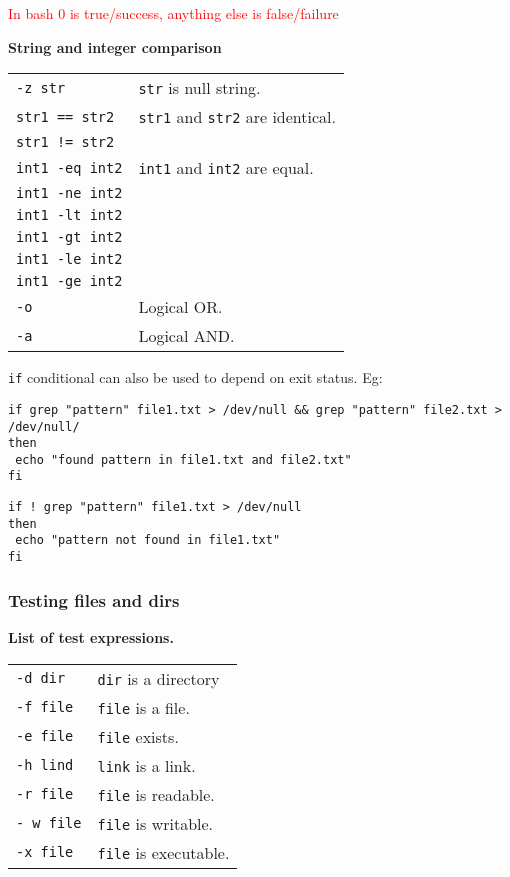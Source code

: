 \textcolor{red}{In bash 0 is true/success, anything else is false/failure}

\textbf{String and integer comparison}
\begin{tabularx}{\linewidth}{lX}
\texttt{-z str} & \texttt{str}  is null string.\\
\texttt{str1 == str2} & \texttt{str1} and \texttt{str2} are identical.\\
\texttt{str1 != str2} & \\
\texttt{int1 -eq int2} & \texttt{int1} and \texttt{int2} are equal.\\
\texttt{int1 -ne int2} & \\
\texttt{int1 -lt int2} & \\
\texttt{int1 -gt int2} & \\
\texttt{int1 -le int2} & \\
\texttt{int1 -ge int2} & \\
\texttt{-o} & Logical OR.\\
\texttt{-a} & Logical AND.\\
\end{tabularx}

\texttt{if} conditional can also be used to depend on exit status. Eg:\\

\begin{mdframed}[nobreak=true]
\texttt{if grep "pattern" file1.txt > /dev/null \&\& grep "pattern" file2.txt > /dev/null/}\\
\texttt{then}\\
\texttt{    echo "found pattern in file1.txt and file2.txt"}\\
\texttt{fi}
\end{mdframed}

\begin{mdframed}
\texttt{if ! grep "pattern" file1.txt > /dev/null}\\
\texttt{then}\\
\texttt{    echo "pattern not found in file1.txt"}\\
\texttt{fi}
\end{mdframed}

\subsubsection{Testing files and dirs}
\textbf{List of test expressions.}\\

\begin{tabularx}{\linewidth}{lX}
\texttt{-d dir} & \texttt{dir} is a directory\\
\texttt{-f file} & \texttt{file} is a file.\\
\texttt{-e file} & \texttt{file} exists.\\
\texttt{-h lind} & \texttt{link} is a link.\\
\texttt{-r file} & \texttt{file} is readable.\\
\texttt{- w file} & \texttt{file} is writable.\\
\texttt{-x file} & \texttt{file} is executable.\\
\end{tabularx}

